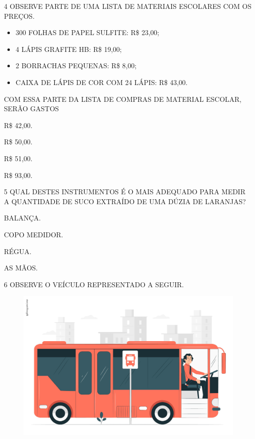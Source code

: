 \num{4} OBSERVE PARTE DE UMA LISTA DE MATERIAIS ESCOLARES COM OS PREÇOS.

\begin{myquote}
\begin{itemize}
  \item 300 FOLHAS DE PAPEL SULFITE: R\$ 23,00;
  \item 4 LÁPIS GRAFITE HB: R\$ 19,00;
  \item 2 BORRACHAS PEQUENAS: R\$ 8,00;
  \item CAIXA DE LÁPIS DE COR COM 24 LÁPIS: R\$ 43,00.
\end{itemize}
\end{myquote}


COM ESSA PARTE DA LISTA DE COMPRAS DE MATERIAL ESCOLAR, SERÃO GASTOS

\begin{multicols}{2}
\begin{escolha}[itemsep=0pt]
\item R\$ 42,00.

\item R\$ 50,00.

\item R\$ 51,00.

\item R\$ 93,00.
\end{escolha}
\end{multicols}

\num{5} QUAL DESTES INSTRUMENTOS É O MAIS ADEQUADO PARA MEDIR A QUANTIDADE DE SUCO EXTRAÍDO DE UMA DÚZIA DE LARANJAS?

\begin{multicols}{2}
\begin{escolha}[itemsep=0pt]
\item BALANÇA.

\item COPO MEDIDOR.

\item RÉGUA.

\item AS MÃOS.
\end{escolha}
\end{multicols}

\num{6} OBSERVE O VEÍCULO REPRESENTADO A SEGUIR.

\begin{figure}[htpb!]
\centering
\includegraphics[width=.3\textwidth]{./media/SAEB_1ANO_MAT_FIGURA138.png}
\end{figure}

